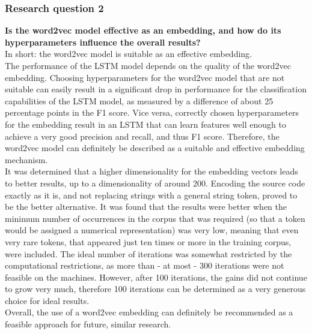 \documentclass[
a4paper,
pagesize,
pdftex,
12pt,
ngerman,
fleqn,
final,
]{scrartcl}
\begin{document}
	\subsubsection{Research question 2}
	\textbf{Is the word2vec model effective as an embedding, and how do its hyperparameters influence the overall results?}\\
	In short: the word2vec model is suitable as an effective embedding.\\
	The performance of the LSTM model depends on the quality of the word2vec embedding. Choosing hyperparameters for the word2vec model that are not suitable can easily result in a significant drop in performance for the classification capabilities of the LSTM model, as measured by a difference of about 25 percentage points in the F1 score. Vice versa, correctly chosen hyperparameters for the embedding result in an LSTM that can learn features well enough to achieve a very good precision and recall, and thus F1 score. Therefore, the word2vec model can definitely be described as a suitable and effective embedding mechanism.\\
	It was determined that a higher dimensionality for the embedding vectors leads to better results, up to a dimensionality of around 200. Encoding the source code exactly as it is, and not replacing strings with a general string token, proved to be the better alternative. It was found that the results were better when the minimum number of occurrences in the corpus that was required (so that a token would be assigned a numerical representation) was very low, meaning that even very rare tokens, that appeared just ten times or more in the training corpus, were included. The ideal number of iterations was somewhat restricted by the computational restrictions, as more than - at most - 300 iterations were not feasible on the machines. However, after 100 iterations, the gains did not continue to grow very much, therefore 100 iterations can be determined as a very generous choice for ideal results.\\
	Overall, the use of a word2vec embedding can definitely be recommended as a feasible approach for future, similar research. 
	
\end{document}
